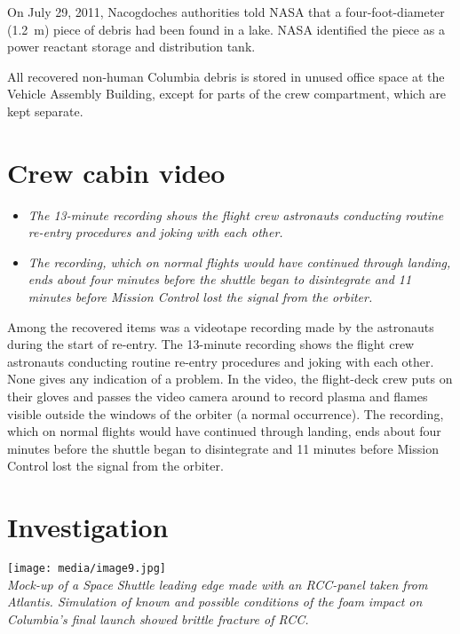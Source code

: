 On July 29, 2011, Nacogdoches authorities told NASA that a
four-foot-diameter (1.2~m) piece of debris had been found in a lake.
NASA identified the piece as a power reactant storage and distribution
tank.

All recovered non-human Columbia debris is stored in unused office space
at the Vehicle Assembly Building, except for parts of the crew
compartment, which are kept separate.

\section{Crew cabin video}\label{crew-cabin-video}

\begin{itemize}
\item
  \emph{The 13-minute recording shows the flight crew astronauts
  conducting routine re-entry procedures and joking with each other.}
\item
  \emph{The recording, which on normal flights would have continued
  through landing, ends about four minutes before the shuttle began to
  disintegrate and 11 minutes before Mission Control lost the signal
  from the orbiter.}
\end{itemize}

Among the recovered items was a videotape recording made by the
astronauts during the start of re-entry. The 13-minute recording shows
the flight crew astronauts conducting routine re-entry procedures and
joking with each other. None gives any indication of a problem. In the
video, the flight-deck crew puts on their gloves and passes the video
camera around to record plasma and flames visible outside the windows of
the orbiter (a normal occurrence). The recording, which on normal
flights would have continued through landing, ends about four minutes
before the shuttle began to disintegrate and 11 minutes before Mission
Control lost the signal from the orbiter.

\section{Investigation}\label{investigation}

\texttt{[image: media/image9.jpg]}\\
\emph{Mock-up of a Space Shuttle leading edge made with an RCC-panel
taken from Atlantis. Simulation of known and possible conditions of the
foam impact on Columbia's final launch showed brittle fracture of RCC.}


